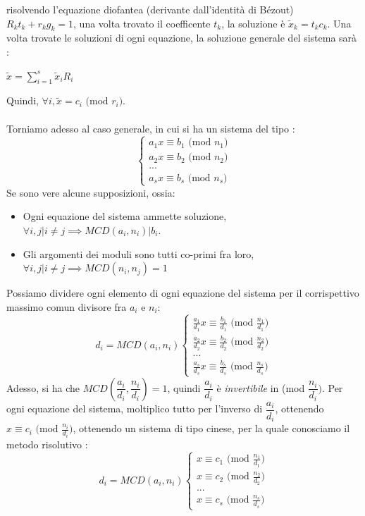 \documentclass[12pt, letterpaper]{article}
\begin{document}
risolvendo l'equazione diofantea (derivante dall'identità di Bézout) \(R_kt_k + r_kg_k=1\), una volta trovato il coefficente \(t_k\), la soluzione 
è \(\tilde x_k=t_kc_k\). Una volta trovate le soluzioni di ogni equazione, la soluzione generale del sistema 
sarà : \begin{center}
    \(\tilde x=\displaystyle\sum_{i=1}^s\tilde x_i R_i\)
\end{center}
Quindi, \(\forall i, \tilde x=c_i \text{ (mod }r_i\text{)}\).\\\hphantom{.}\\
Torniamo adesso al caso generale, in cui si ha un sistema del tipo :\begin{equation}
    \begin{cases}
        a_1x\equiv b_1 \text{ (mod }n_1\text{)}\\
        a_2x\equiv b_2 \text{ (mod }n_2\text{)}\\
        ...\\ a_sx\equiv b_s \text{ (mod }n_s\text{)}
    \end{cases}
\end{equation}
Se sono vere alcune supposizioni, ossia:\begin{itemize}
    \item Ogni equazione del sistema ammette soluzione, \(\forall i,j| i\ne j \implies MCD(a_i,n_i)|b_i\).
    \item Gli argomenti dei moduli sono tutti co-primi fra loro, \(\forall i,j|i\ne j \implies MCD(n_i,n_j)=1\)
\end{itemize}
Possiamo dividere ogni elemento di ogni equazione del sistema per il corrispettivo massimo comun divisore fra \(a_i\) e \(n_i\):
\begin{equation}
    d_i=MCD(a_i,n_i)\begin{cases}
        \frac{a_1}{d_1}x\equiv \frac{b_1}{d_1} \text{ (mod }\frac{n_1}{d_1}\text{)}\\
        \frac{a_2}{d_2}x\equiv \frac{b_2}{d_2} \text{ (mod }\frac{n_2}{d_2}\text{)}\\
        ...\\ \frac{a_s}{d_s}x\equiv \frac{b_s}{d_s} \text{ (mod }\frac{n_s}{d_s}\text{)}
    \end{cases}
\end{equation}
Adesso, si ha che \(MCD(\dfrac{a_i}{d_i},\dfrac{n_i}{d_i})=1\), quindi \(\dfrac{a_i}{d_i}\) è \textit{invertibile} 
in (mod \(\dfrac{n_i}{d_i})\). Per ogni equazione del sistema, moltiplico tutto per l'inverso di \(\dfrac{a_i}{d_i}\), 
ottenendo \(x\equiv c_i \text{ (mod }\frac{n_i}{d_i}\text{)}\), ottenendo un sistema di tipo cinese, per la quale 
conosciamo il metodo risolutivo :
\begin{equation}
    d_i=MCD(a_i,n_i)\begin{cases}
       x\equiv c_1 \text{ (mod }\frac{n_1}{d_1}\text{)}\\
        x\equiv c_2 \text{ (mod }\frac{n_2}{d_2}\text{)}\\
        ...\\ x\equiv c_s \text{ (mod }\frac{n_s}{d_s}\text{)}
    \end{cases}
\end{equation}
\end{document}
